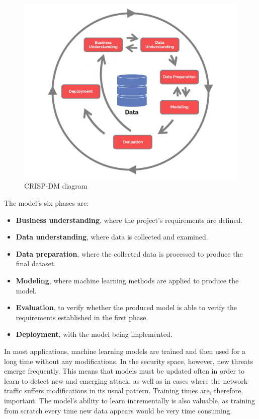 \begin{figure}
    \centering
    \includegraphics[width = .7\textwidth]{img/parts/introduction/CRISP-DM.png}
    \caption{CRISP-DM diagram \citep{DSPA}}
    \label{fig:CRISP-DM}
\end{figure}

The model's six phases are:

\begin{itemize}
    \item \textbf{Business understanding}, where the project's requirements are defined.
    \item \textbf{Data understanding}, where data is collected and examined.
    \item \textbf{Data preparation}, where the collected data is processed to produce the final dataset.
    \item \textbf{Modeling}, where machine learning methods are applied to produce the model.
    \item \textbf{Evaluation}, to verify whether the produced model is able to verify the requirements established in the first phase.
    \item \textbf{Deployment}, with the model being implemented.
\end{itemize}

In most applications, machine learning models are trained and then used for a long time without any modifications. In the security space, however, new threats emerge frequently. This means that models must be updated often in order to learn to detect new and emerging attack, as well as in cases where the network traffic suffers modifications in its usual pattern. Training times are, therefore, important. The model's ability to learn incrementally is also valuable, as training from scratch every time new data appears would be very time consuming.\par


